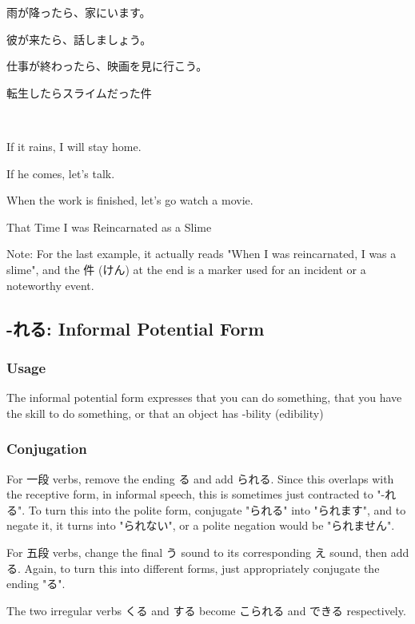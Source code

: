 \documentclass{article}
\begin{document}
\begin{CJK}{UTF8}{min}
\begin{example}
雨が降ったら、家にいます。

彼が来たら、話しましょう。

仕事が終わったら、映画を見に行こう。

転生したらスライムだった件
\end{example}

\begin{solution}
\ 

If it rains, I will stay home.

If he comes, let's talk.

When the work is finished, let's go watch a movie.

That Time I was Reincarnated as a Slime
\end{solution}

Note: For the last example, it actually reads "When I was reincarnated, I was a slime", and the 件 (けん) at the end is a marker used for an incident or a noteworthy event.

\subsection{-れる: Informal Potential Form}

\subsubsection{Usage}

The informal potential form expresses that you can do something, that you have the skill to do something, or that an object has -bility (edibility)



\subsubsection{Conjugation}

For 一段 verbs, remove the ending る and add られる. Since this overlaps with the receptive form, in informal speech, this is sometimes just contracted to "-れる". To turn this into the polite form, conjugate "られる" into "られます", and to negate it, it turns into "られない", or a polite negation would be "られません".

For 五段 verbs, change the final う sound to its corresponding え sound, then add る. Again, to turn this into different forms, just appropriately conjugate the ending "る".

The two irregular verbs くる and する become こられる and できる respectively.




\end{CJK}
\end{document}
